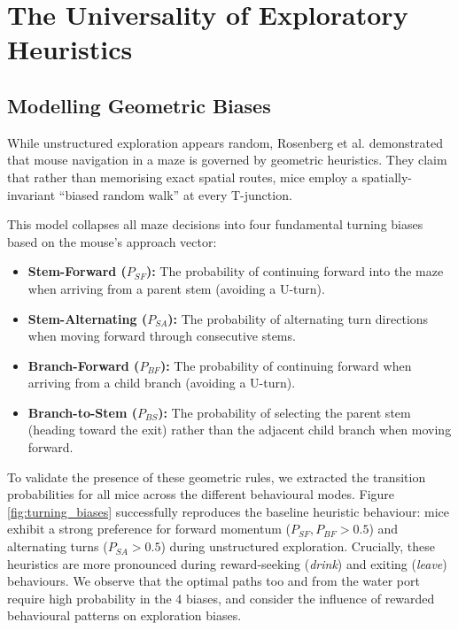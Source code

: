 \section{The Universality of Exploratory Heuristics}
\label{sec:exploration_biases}

\subsection{Modelling Geometric Biases}
While unstructured exploration appears random, Rosenberg et al. \cite{rosenberg2021mice} demonstrated that mouse navigation in a maze is governed by geometric heuristics. They claim that rather than memorising exact spatial routes, mice employ a spatially-invariant ``biased random walk'' at every T-junction. 

This model collapses all maze decisions into four fundamental turning biases based on the mouse's approach vector:
\begin{itemize}
    \item \textbf{Stem-Forward ($P_{SF}$):} The probability of continuing forward into the maze when arriving from a parent stem (avoiding a U-turn).
    \item \textbf{Stem-Alternating ($P_{SA}$):} The probability of alternating turn directions when moving forward through consecutive stems.
    \item \textbf{Branch-Forward ($P_{BF}$):} The probability of continuing forward when arriving from a child branch (avoiding a U-turn).
    \item \textbf{Branch-to-Stem ($P_{BS}$):} The probability of selecting the parent stem (heading toward the exit) rather than the adjacent child branch when moving forward.
\end{itemize}

To validate the presence of these geometric rules, we extracted the transition probabilities for all mice across the different behavioural modes. Figure \ref{fig:turning_biases} successfully reproduces the baseline heuristic behaviour: mice exhibit a strong preference for forward momentum ($P_{SF}, P_{BF} > 0.5$) and alternating turns ($P_{SA} > 0.5$) during unstructured exploration. Crucially, these heuristics are more pronounced during reward-seeking (\textit{drink}) and exiting (\textit{leave}) behaviours. We observe that the optimal paths too and from the water port require high probability in the 4 biases, and consider the influence of rewarded behavioural patterns on exploration biases.

